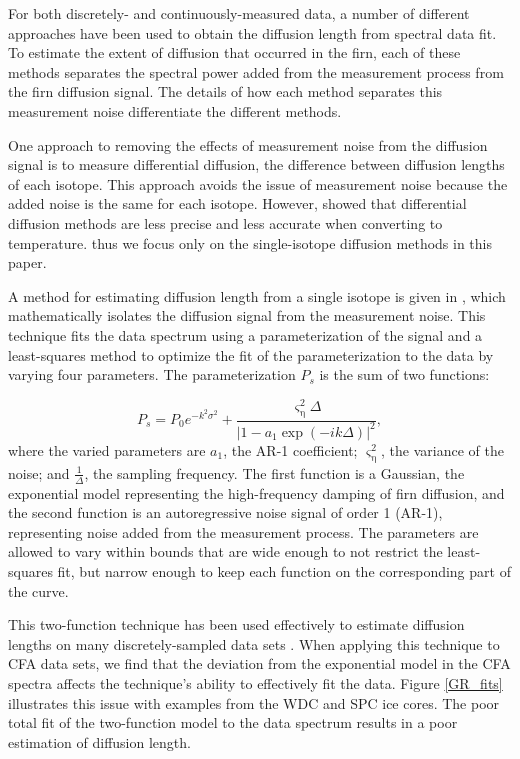 \documentclass[draft, jgrga]{AGUTeX}
\begin{document}
\begin{article}
For both discretely- and continuously-measured data, a number of different approaches have been used to obtain the diffusion length from spectral data fit. To estimate the extent of diffusion that occurred in the firn, each of these methods separates the spectral power added from the measurement process from the firn diffusion signal. The details of how each method separates this measurement noise differentiate the different methods.

One approach to removing the effects of measurement noise from the diffusion signal is to measure differential diffusion, the difference between diffusion lengths of each isotope. This approach avoids the issue of measurement noise because the added noise is the same for each isotope. However, \citet{Holme2017} showed that differential diffusion methods are less precise and less accurate when converting to temperature. thus we focus only on the single-isotope diffusion methods in this paper.

A method for estimating diffusion length from a single isotope is given in \citet{Gkinis2014}, which mathematically isolates the diffusion signal from the measurement noise. This technique fits the data spectrum using a parameterization of the signal and a least-squares method to optimize the fit of the parameterization to the data by varying four parameters. The parameterization $P_s$ is the sum of two functions:

\begin{equation}
P_s =    P_0 {e}^{-k^2 \sigma^2} + \frac{\varsigma_{\mathrm{\eta}}^2 \Delta}
{\left| 1-a_1 \exp{\left( -i k  \Delta \right) } \right|^2},
\label{eq:powerspectrum}
\end{equation}
where the varied parameters are $a_1$, the AR-1 coefficient; $\varsigma_{\mathrm{\eta}}^2$, the variance of the noise; and $\frac{1}{\Delta}$, the sampling frequency. The first function is a Gaussian, the exponential model representing the high-frequency damping of firn diffusion, and the second function is an autoregressive noise signal of order 1 (AR-1), representing noise added from the measurement process. The parameters are allowed to vary within bounds that are wide enough to not restrict the least-squares fit, but narrow enough to keep each function on the corresponding part of the curve.

This two-function technique has been used effectively to estimate diffusion lengths on many discretely-sampled data sets \citep{Gkinis2014,Holme2017}. When applying this technique to CFA data sets, we find that the deviation from the exponential model in the CFA spectra affects the technique's ability to effectively fit the data. Figure \ref{GR_fits} illustrates this issue with examples from the WDC and SPC ice cores. The poor total fit of the two-function model to the data spectrum results in a poor estimation of diffusion length.


\end{article}
\end{document}
